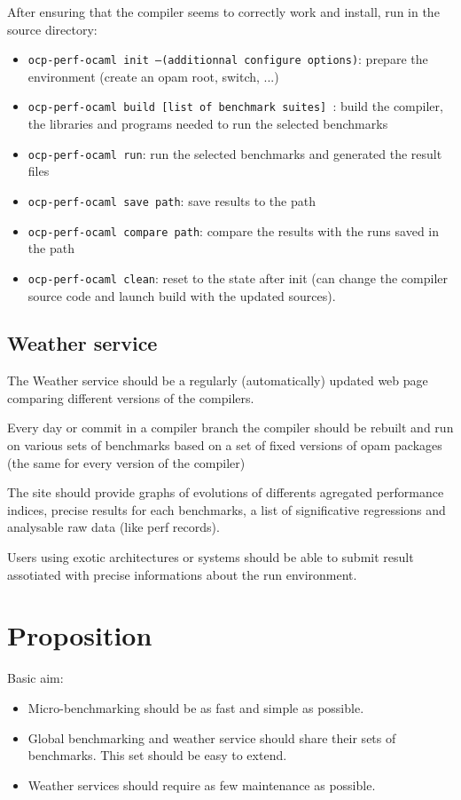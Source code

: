 \documentclass[11pt,a4paper]{article}
\begin{document}
After ensuring that the compiler seems to correctly work and install,
run in the source directory:

\begin{itemize}
\item {\tt ocp-perf-ocaml init --(additionnal configure options)}: prepare the environment (create an opam root, switch, ...)
\item {\tt ocp-perf-ocaml build [list of benchmark suites] }: build the compiler, the libraries and programs needed to run the selected benchmarks
\item {\tt ocp-perf-ocaml run}: run the selected benchmarks and generated the result files
\item {\tt ocp-perf-ocaml save path}: save results to the path
\item {\tt ocp-perf-ocaml compare path}: compare the results with the runs saved in the path
\item {\tt ocp-perf-ocaml clean}: reset to the state after init (can change the compiler source code and launch build with the updated sources).
\end{itemize}

\subsection{Weather service}

The Weather service should be a regularly (automatically) updated web
page comparing different versions of the compilers.

Every day or commit in a compiler branch the compiler should be
rebuilt and run on various sets of benchmarks based on a set of fixed
versions of opam packages (the same for every version of the compiler)

The site should provide graphs of evolutions of differents agregated
performance indices, precise results for each benchmarks, a list of
significative regressions and analysable raw data (like perf records).

Users using exotic architectures or systems should be able to submit
result assotiated with precise informations about the run environment.

\section{Proposition}

Basic aim:
\begin{itemize}
\item Micro-benchmarking should be as fast and simple as possible.
\item Global benchmarking and weather service should share their sets
  of benchmarks. This set should be easy to extend.
\item Weather services should require as few maintenance as possible.
\end{itemize}
\end{document}
